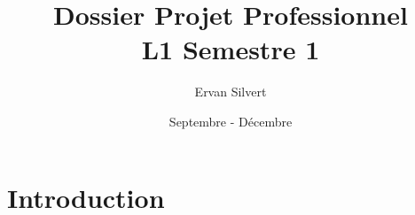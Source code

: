 \documentclass[12pt, a4paper]{report} %
\author{Ervan Silvert}
\title{Dossier Projet Professionnel \\ L1 Semestre 1}
\date{Septembre - Décembre}
\begin{document}





\newcommand{\finalword}[1]{\\ \begin{center} \textsc{#1} \end{center} }
\newcommand{\qst}[1]{{\slshape \bfseries \center   #1}}
\newcommand{\asw}[2]{\paragraph{\scriptsize #1} \begin{quotation} {\slshape  \og #2 \fg}  \end{quotation}}
\newcommand{\aswTwo}[2]{\paragraph{\scriptsize #1} {\begin{multicols}{2}  \slshape  \og #2 \fg \end{multicols} }}
\newcommand{\analyse}[1]{ \paragraph{\textbf{Analyse}} {#1} }
\newcommand{\lil}[1]{{\scriptsize (#1)}}
\newcommand{\ecite}[1]{{\cite{#1}}}
\newcommand{\offsite}[1]{\footnote{Site officiel: \url{#1}}}
\newcommand{\pdf}[1]{ \texttt{[image: Offres/\#1.pdf]}  }
\newcommand{\cubical}{Fabien Perrot {\slshape aka CodingMarmot}}
\newcommand{\agg}{Antoine Guerchais, {\slshape le Généreux}}
\newcommand{\sr}{Sophie Remy}
\newcommand{\etc}{{\itshape etc.}}
\newcommand{\lni}{{\slshape La Nuit de L'informatique 2014 }}
\newcommand{\ingls}{\footnote{La définition de ce mot se trouve dans le glossaire en \ref{glos}}}
\newcommand{\acrnote}[1]{\acrshort{#1}\ingls{}}


\maketitle


\chapter{Introduction}
\end{document}
